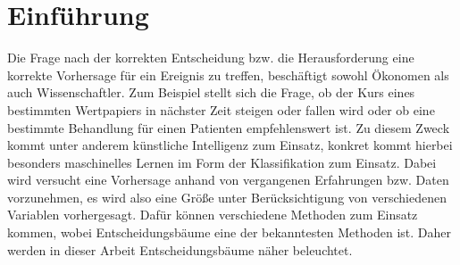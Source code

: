 \chapter{Einführung}
\label{einfuehrung}

Die Frage nach der korrekten Entscheidung bzw. die Herausforderung eine korrekte Vorhersage für ein Ereignis zu treffen, beschäftigt sowohl Ökonomen als auch Wissenschaftler. Zum Beispiel stellt sich die Frage, ob der Kurs eines bestimmten Wertpapiers in nächster Zeit steigen oder fallen wird oder ob eine bestimmte Behandlung für einen Patienten empfehlenswert ist. \autocite{QuinlanDecisionTrees}
Zu diesem Zweck kommt unter anderem künstliche Intelligenz zum Einsatz, konkret kommt hierbei besonders maschinelles Lernen im Form der Klassifikation zum Einsatz. \autocite{QuinlanID3} Dabei wird versucht eine Vorhersage anhand von vergangenen Erfahrungen bzw. Daten vorzunehmen, es wird also eine Größe unter Berücksichtigung von verschiedenen Variablen vorhergesagt. Dafür können verschiedene Methoden zum Einsatz kommen, wobei Entscheidungsbäume eine der bekanntesten Methoden ist. Daher werden in dieser Arbeit Entscheidungsbäume näher beleuchtet.